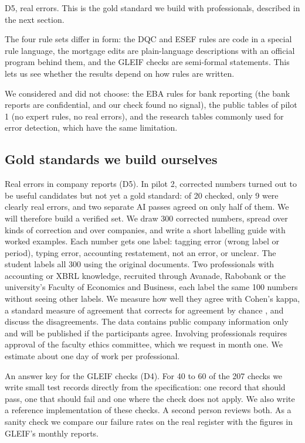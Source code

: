 \documentclass[11pt,a4paper]{article}
\begin{document}
D5, real errors. This is the gold standard we build with professionals, described in the next section.

The four rule sets differ in form: the DQC and ESEF rules are code in a special rule language, the mortgage edits are plain-language descriptions with an official program behind them, and the GLEIF checks are semi-formal statements. This lets us see whether the results depend on how rules are written.

We considered and did not choose: the EBA rules for bank reporting (the bank reports are confidential, and our check found no signal), the public tables of pilot 1 (no expert rules, no real errors), and the research tables commonly used for error detection, which have the same limitation.

\subsection{Gold standards we build ourselves}
\label{sec:own}

Real errors in company reports (D5). In pilot 2, corrected numbers turned out to be useful candidates but not yet a gold standard: of 20 checked, only 9 were clearly real errors, and two separate AI passes agreed on only half of them. We will therefore build a verified set. We draw 300 corrected numbers, spread over kinds of correction and over companies, and write a short labelling guide with worked examples. Each number gets one label: tagging error (wrong label or period), typing error, accounting restatement, not an error, or unclear. The student labels all 300 using the original documents. Two professionals with accounting or XBRL knowledge, recruited through Avanade, Rabobank or the university's Faculty of Economics and Business, each label the same 100 numbers without seeing other labels. We measure how well they agree with Cohen's kappa, a standard measure of agreement that corrects for agreement by chance \cite{cohen}, and discuss the disagreements. The data contains public company information only and will be published if the participants agree. Involving professionals requires approval of the faculty ethics committee, which we request in month one. We estimate about one day of work per professional.

An answer key for the GLEIF checks (D4). For 40 to 60 of the 207 checks we write small test records directly from the specification: one record that should pass, one that should fail and one where the check does not apply. We also write a reference implementation of these checks. A second person reviews both. As a sanity check we compare our failure rates on the real register with the figures in GLEIF's monthly reports.
\end{document}
